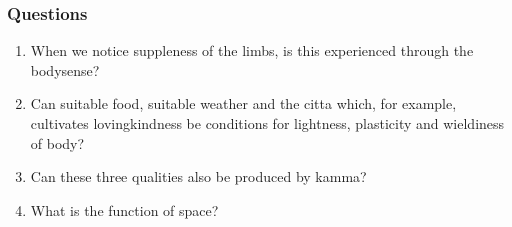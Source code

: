 \documentclass{book}
\begin{document}
\subsection*{Questions}




\begin{enumerate}
\item When we notice suppleness of the limbs, is this experienced 
through the bodysense? 

\item Can suitable food, suitable weather and the citta which, for 
example, cultivates lovingkindness be conditions for lightness, plasticity and wieldiness of body?

\item Can these three qualities also be produced by kamma?

\item What is the function of space?

\end{enumerate}



































































\chapter[Characteristics of all R\=upas]{}
\end{document}
